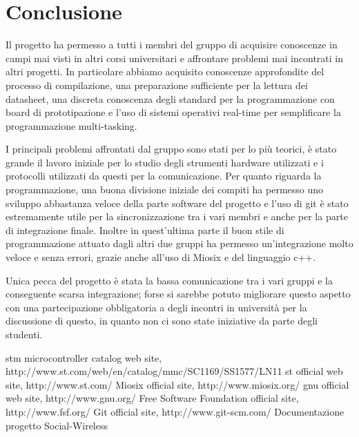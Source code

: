 \chapter{Conclusione}
Il progetto ha permesso a tutti i membri del gruppo di acquisire conoscenze in campi mai visti in altri corsi universitari e affrontare problemi mai incontrati in altri progetti. In particolare abbiamo acquisito conoscenze approfondite del processo di compilazione, una preparazione sufficiente per la lettura dei datasheet, una discreta conoscenza degli standard per la programmazione con board di prototipazione e l'uso di sistemi operativi real-time per semplificare la programmazione multi-tasking.\par
I principali problemi affrontati dal gruppo sono stati per lo più teorici, è stato grande il lavoro iniziale per lo studio degli strumenti hardware utilizzati e i protocolli utilizzati da questi per la comunicazione. Per quanto riguarda la programmazione, una buona divisione iniziale dei compiti ha permesso uno sviluppo abbastanza veloce della parte software del progetto e l'uso di git è stato estremamente utile per la sincronizzazione tra i vari membri e anche per la parte di integrazione finale. Inoltre in quest'ultima parte il buon stile di programmazione attuato dagli altri due gruppi ha permesso un'integrazione molto veloce e senza errori, grazie anche all'uso di Miosix e del linguaggio c++.\par
Unica pecca del progetto è stata la bassa comunicazione tra i vari gruppi e la conseguente scarsa integrazione; forse si sarebbe potuto migliorare questo aspetto con una partecipazione obbligatoria a degli incontri in università per la discussione di questo, in quanto non ci sono state iniziative da parte degli studenti.

\begin{thebibliography}{99}

	 stm microcontroller catalog web site,\\http://www.st.com/web/en/catalog/mmc/SC1169/SS1577/LN11
	 st official web site, http://www.st.com/
	 Miosix official site, http://www.miosix.org/
	 gnu official web site, http://www.gnu.org/
	 Free Software Foundation official site, http://www.fsf.org/
	 Git official site, http://www.git-scm.com/
	 Documentazione progetto Social-Wireless

\end{thebibliography}


